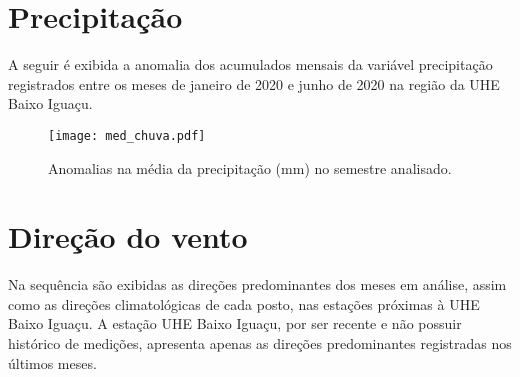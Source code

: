 \documentclass[a4paper,12pt]{article}
\begin{document}
        
        \newpage
        
        \section{Precipitação }
        \hspace{0.5cm} A seguir é exibida a anomalia dos acumulados mensais da variável precipitação registrados entre 
        os meses de janeiro de 2020 e junho de 2020 na região da UHE Baixo Iguaçu.
        
        \begin{figure}[!htb]
        \centering
        \texttt{[image: med\_chuva.pdf]}
        \caption{Anomalias na média da precipitação (mm) no semestre analisado.}
        \label{fig:figmed_chuva}
        \end{figure}
        
        \newpage
        
\section{Direção do vento}

\hspace{0.5cm} Na sequência são exibidas as direções predominantes dos meses em análise, assim como as direções
climatológicas de cada posto, nas estações próximas à UHE Baixo Iguaçu. A estação UHE Baixo Iguaçu, por
ser recente e não possuir histórico de medições, apresenta apenas as direções predominantes registradas nos 
últimos meses.
 
\end{document}
